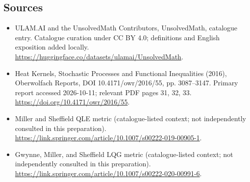 \documentclass[11pt]{article}
\begin{document}
\subsection{Sources}
\begin{itemize}
\item[\hypertarget{source:statement:1}{S1}] ULAM.AI and the UnsolvedMath Contributors, UnsolvedMath, catalogue entry. Catalogue curation under CC BY 4.0; definitions and English exposition added locally.
\url{https://huggingface.co/datasets/ulamai/UnsolvedMath}.
\item[\hypertarget{source:statement:2}{S2}] Heat Kernels, Stochastic Processes and Functional Inequalities (2016), Oberwolfach Reports, DOI 10.4171/owr/2016/55, pp. 3087--3147. Primary report accessed 2026-10-11; relevant PDF pages 31, 32, 33.
\url{https://doi.org/10.4171/owr/2016/55}.
\item[\hypertarget{source:statement:3}{S3}] Miller and Sheffield QLE metric (catalogue-listed context; not independently consulted in this preparation).
\url{https://link.springer.com/article/10.1007/s00222-019-00905-1}.
\item[\hypertarget{source:statement:4}{S4}] Gwynne, Miller, and Sheffield LQG metric (catalogue-listed context; not independently consulted in this preparation).
\url{https://link.springer.com/article/10.1007/s00222-020-00991-6}.
\end{itemize}
\label{end:statement}
\end{document}

